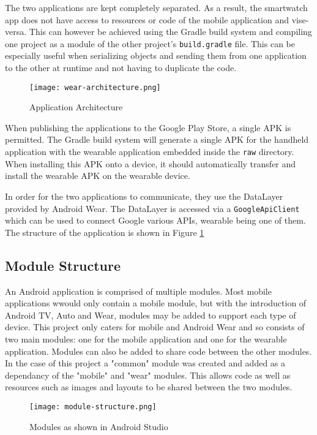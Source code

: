 The two applications are kept completely separated. As a result, the smartwatch
app does not have access to resources or code of the mobile application and
vise-versa. This can however be achieved using the Gradle build system and
compiling one project as a module of the other project's \texttt{build.gradle}
file. This can be especially useful when serializing objects and sending them
from one application to the other at runtime and not having to duplicate the
code.

\begin{figure}
    \centering
    \texttt{[image: wear-architecture.png]}
    \caption{Application Architecture}
    \label{fig:app_structure}
\end{figure}

When publishing the applications to the Google Play Store, a single APK is
permitted. The Gradle build system will generate a single APK for the handheld
application with the wearable application embedded inside the \texttt{raw}
directory. When installing this APK onto a device, it should automatically
transfer and install the wearable APK on the wearable device.

In order for the two applications to communicate, they use the DataLayer
provided by Android Wear. The DataLayer is accessed via a
\texttt{GoogleApiClient} which can be used to connect Google various APIs,
wearable being one of them. The structure of the application is shown in Figure
\ref{fig:app_structure}

\subsection{Module Structure}

An Android application is comprised of multiple modules. Most mobile
applications wwould only contain a mobile module, but with the introduction of
Android TV, Auto and Wear, modules may be added to support each type of device.
This project only caters for mobile and Android Wear and so consists of two
main modules: one for the mobile application and one for the wearable
application. Modules can also be added to share code between the other modules.
In the case of this project a "common" module was created and added as a
dependancy of the "mobile" and "wear" modules. This allows code as well as
resources such as images and layouts to be shared between the two modules.

\begin{figure}
    \centering
    \texttt{[image: module-structure.png]}
    \caption{Modules as shown in Android Studio}
    \label{fig:desktop_module_structure}
\end{figure}

